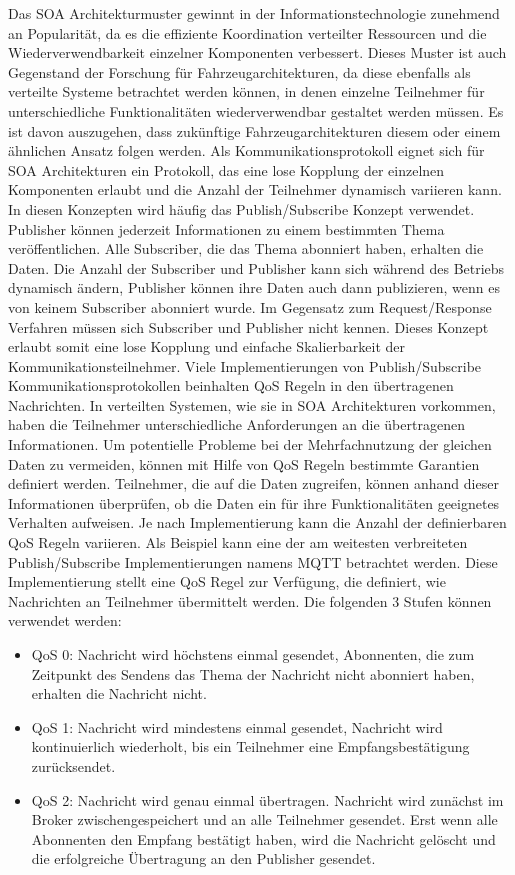 Das \gls{SOA} Architekturmuster gewinnt in der Informationstechnologie zunehmend an Popularität, da es die effiziente Koordination verteilter Ressourcen und die Wiederverwendbarkeit einzelner Komponenten verbessert. Dieses Muster ist auch Gegenstand der Forschung für Fahrzeugarchitekturen, da diese ebenfalls als verteilte Systeme betrachtet werden können, in denen einzelne Teilnehmer für unterschiedliche Funktionalitäten wiederverwendbar gestaltet werden müssen. Es ist davon auszugehen, dass zukünftige Fahrzeugarchitekturen diesem oder einem ähnlichen Ansatz folgen werden. Als Kommunikationsprotokoll eignet sich für \gls{SOA} Architekturen ein Protokoll, das eine lose Kopplung der einzelnen Komponenten erlaubt und die Anzahl der Teilnehmer dynamisch variieren kann. In diesen Konzepten wird häufig das Publish/Subscribe Konzept verwendet. Publisher können jederzeit Informationen zu einem bestimmten Thema veröffentlichen. Alle Subscriber, die das Thema abonniert haben, erhalten die Daten. Die Anzahl der Subscriber und Publisher kann sich während des Betriebs dynamisch ändern, Publisher können ihre Daten auch dann publizieren, wenn es von keinem Subscriber abonniert wurde. Im Gegensatz zum Request/Response Verfahren müssen sich Subscriber und Publisher nicht kennen. Dieses Konzept erlaubt somit eine lose Kopplung und einfache Skalierbarkeit der Kommunikationsteilnehmer. Viele Implementierungen von Publish/Subscribe Kommunikationsprotokollen beinhalten \gls{QoS} Regeln in den übertragenen Nachrichten. In verteilten Systemen, wie sie in \gls{SOA} Architekturen vorkommen, haben die Teilnehmer unterschiedliche Anforderungen an die übertragenen Informationen. Um potentielle Probleme bei der Mehrfachnutzung der gleichen Daten zu vermeiden, können mit Hilfe von \gls{QoS} Regeln bestimmte Garantien definiert werden. Teilnehmer, die auf die Daten zugreifen, können anhand dieser Informationen überprüfen, ob die Daten ein für ihre Funktionalitäten geeignetes Verhalten aufweisen. Je nach Implementierung kann die Anzahl der definierbaren \gls{QoS} Regeln variieren. Als Beispiel kann eine der am weitesten verbreiteten Publish/Subscribe Implementierungen namens \gls{MQTT} betrachtet werden. Diese Implementierung stellt eine \gls{QoS} Regel zur Verfügung, die definiert, wie Nachrichten an Teilnehmer übermittelt werden. Die folgenden 3 Stufen können verwendet werden:

\begin{itemize}
    \item \gls{QoS} 0: Nachricht wird höchstens einmal gesendet, Abonnenten, die zum Zeitpunkt des Sendens das Thema der Nachricht nicht abonniert haben, erhalten die Nachricht nicht.
    \item \gls{QoS} 1: Nachricht wird mindestens einmal gesendet, Nachricht wird kontinuierlich wiederholt, bis ein Teilnehmer eine Empfangsbestätigung zurücksendet.
    \item \gls{QoS} 2: Nachricht wird genau einmal übertragen. Nachricht wird zunächst im Broker zwischengespeichert und an alle Teilnehmer gesendet. Erst wenn alle Abonnenten den Empfang bestätigt haben, wird die Nachricht gelöscht und die erfolgreiche Übertragung an den Publisher gesendet. 
\end{itemize}

